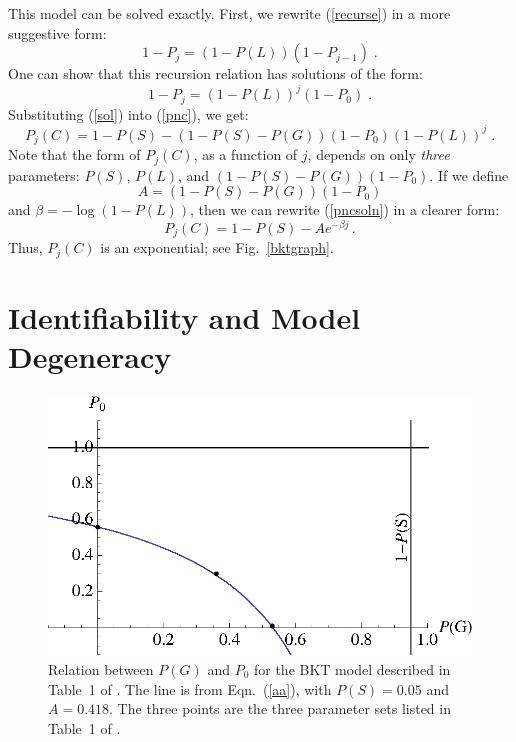 \documentclass{acmlarge-edm}
\begin{document}
This model can be  solved exactly.  First, we rewrite (\ref{recurse}) in a
more suggestive form:
%
\begin{equation}
        1-P_j = \left(1-P(L)\right) \left(1-P_{j-1}\right) \; .
\end{equation}
%
One can show that this recursion relation has solutions of the form:
%
\begin{equation}
            1-P_j = \left(1-P(L)\right)^j\left(1-P_0\right) \; .
	    \label{sol}
\end{equation}
%
%
Substituting (\ref{sol}) into (\ref{pnc}), we get:
%
\begin{equation}
         P_j(C) = 1-P(S) -\left(1-P(S)-P(G)\right) \left(1-P_0\right)
                   \left(1-P(L)\right)^j \; . \label{pncsoln}
\end{equation}
%
Note that the form of $P_j(C)$, as a function of $j$, 
depends on only {\em three} parameters:  $P(S)$, $P(L)$, and 
$\left(1-P(S)-P(G)\right) \left(1-P_0\right)$.
If we define
%
\begin{equation} 
          A=\left(1-P(S)-P(G)\right) \left(1-P_0\right)  \label{aa}
\end{equation}
%
 and $\beta=-\log(1-P(L))$, then we can rewrite (\ref{pncsoln}) in 
a clearer form:
%
\begin{equation}
         P_j(C) = 1-P(S) -A e^{-\beta j} \, .
\end{equation}
%
Thus, $P_j(C)$ is an exponential; see Fig.~\ref{bktgraph}.

\section{Identifiability and Model Degeneracy}


\begin{figure}
\centering\includegraphics{table1.eps}
\caption{Relation between $P(G)$ and $P_0$ for the BKT model
  described in Table~1 of \cite{beck_identifiability:_2007}.  
  The line is from Eqn.~(\ref{aa}), with $P(S)=0.05$ and $A=0.418$.
  The three points are the  three parameter sets listed in Table~1 of
  \cite{beck_identifiability:_2007}. 
 }
 \label{table1}
\end{figure}
\end{document}
